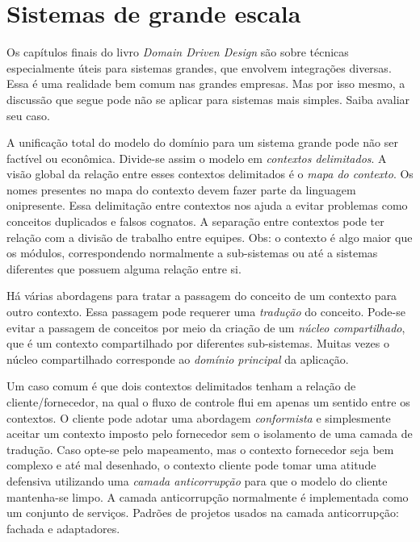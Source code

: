 \documentclass[a4paper, 12pt]{article}
\newcommand{\ddd}{\emph{Domain Driven Design}\xspace}
\begin{document}
\section{Sistemas de grande escala}

Os capítulos finais do livro \ddd são sobre técnicas especialmente úteis para sistemas grandes, que envolvem integrações diversas. Essa é uma realidade bem comum nas grandes empresas. Mas por isso mesmo, a discussão que segue pode não se aplicar para sistemas mais simples. Saiba avaliar seu caso.

A unificação total do modelo do domínio para um sistema grande pode não ser factível ou econômica. Divide-se assim o modelo em \emph{contextos delimitados}. A visão global da relação entre esses contextos delimitados é o \emph{mapa do contexto}. Os nomes presentes no mapa do contexto devem fazer parte da linguagem onipresente. Essa delimitação entre contextos nos ajuda a evitar problemas como conceitos duplicados e falsos cognatos. A separação entre contextos pode ter relação com a divisão de trabalho entre equipes. Obs: o contexto é algo maior que os módulos, correspondendo normalmente a sub-sistemas ou até a sistemas diferentes que possuem alguma relação entre si.


Há várias abordagens para tratar a passagem do conceito de um contexto para outro contexto. Essa passagem pode requerer uma \emph{tradução} do conceito. Pode-se evitar a passagem de conceitos por meio da criação de um \emph{núcleo compartilhado}, que é um contexto compartilhado por diferentes sub-sistemas. Muitas vezes o núcleo compartilhado corresponde ao \emph{domínio principal} da aplicação.

Um caso comum é que dois contextos delimitados tenham a relação de cliente/fornecedor, na qual o fluxo de controle flui em apenas um sentido entre os contextos. O cliente pode adotar uma abordagem \emph{conformista} e simplesmente aceitar um contexto imposto pelo fornecedor sem o isolamento de uma camada de tradução. Caso opte-se pelo mapeamento, mas o contexto fornecedor seja bem complexo e até mal desenhado, o contexto cliente pode tomar uma atitude defensiva utilizando uma \emph{camada anticorrupção} para que o modelo do cliente mantenha-se limpo. A camada anticorrupção normalmente é implementada como um conjunto de serviços. Padrões de projetos usados na camada anticorrupção: fachada e adaptadores. 
\end{document}
